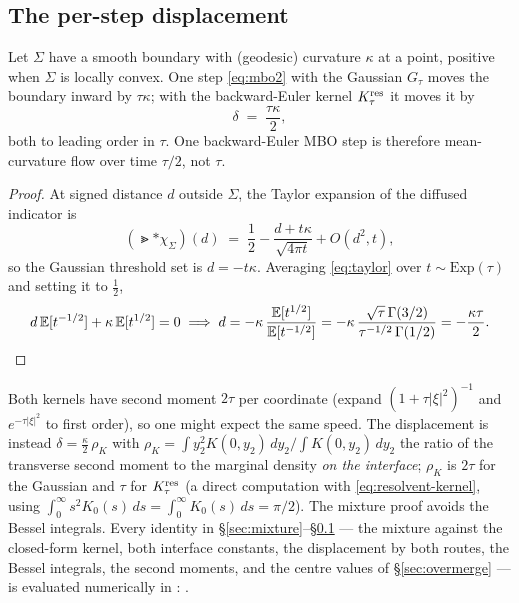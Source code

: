 \documentclass[11pt,a4paper]{article}
\begin{document}
\subsection{The per-step displacement}
\label{sec:displacement}

\begin{prop}
\label{prop:displacement}
Let $\Sigma$ have a smooth boundary with (geodesic) curvature $\kappa$ at a point,
positive when $\Sigma$ is locally convex. One step \eqref{eq:mbo2} with the
Gaussian $G_\tau$ moves the boundary inward by $\tau\kappa$; with the
backward-Euler kernel $K^{\mathrm{res}}_\tau$ it moves it by
\begin{equation}
  \delta \;=\; \frac{\tau\kappa}{2},
  \label{eq:displacement}
\end{equation}
both to leading order in $\tau$. One backward-Euler MBO step is therefore
mean-curvature flow over time $\tau/2$, not $\tau$.
\end{prop}
\begin{proof}
At signed distance $d$ outside $\Sigma$, the Taylor expansion of the diffused
indicator is \cite[\S5]{esedoglu2015threshold}
\begin{equation}
  (\Gt * \chi_\Sigma)(d) \;=\; \frac12 - \frac{d + t\kappa}{\sqrt{4\pi t}} + O(d^2, t),
  \label{eq:taylor}
\end{equation}
so the Gaussian threshold set is $d = -t\kappa$. Averaging \eqref{eq:taylor} over
$t \sim \mathrm{Exp}(\tau)$ and setting it to $\tfrac12$,
\[
  d\,\mathbb{E}[t^{-1/2}] + \kappa\, \mathbb{E}[t^{1/2}] = 0
  \;\Longrightarrow\;
  d = -\kappa\, \frac{\mathbb{E}[t^{1/2}]}{\mathbb{E}[t^{-1/2}]}
    = -\kappa\, \frac{\sqrt\tau\, \Gamma(3/2)}{\tau^{-1/2}\, \Gamma(1/2)}
    = -\frac{\kappa\tau}{2}. \qedhere
\]
\end{proof}

\begin{remark}
Both kernels have second moment $2\tau$ per coordinate (expand
$(1 + \tau|\xi|^2)^{-1}$ and $e^{-\tau|\xi|^2}$ to first order), so one might
expect the same speed. The displacement is instead $\delta = \tfrac{\kappa}{2}\, \rho_K$ with
$\rho_K = \int y_2^2 K(0, y_2)\, dy_2 \big/ \int K(0, y_2)\, dy_2$ the ratio of the
transverse second moment to the marginal density \emph{on the interface}; $\rho_K$
is $2\tau$ for the Gaussian and $\tau$ for $K^{\mathrm{res}}_\tau$ (a direct computation with
\eqref{eq:resolvent-kernel}, using $\int_0^\infty s^2 K_0(s)\, ds = \int_0^\infty K_0(s)\, ds = \pi/2$).
The mixture proof avoids the Bessel integrals.
Every identity in \S\ref{sec:mixture}--\S\ref{sec:displacement} --- the mixture
against the closed-form kernel, both interface constants, the displacement by
both routes, the Bessel integrals, the second moments, and the centre values of
\S\ref{sec:overmerge} --- is evaluated numerically in :
.
\end{remark}
\end{document}
